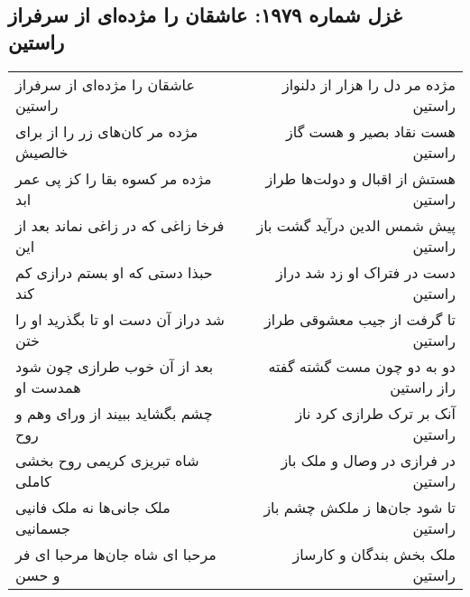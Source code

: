 \begin{center}
\section*{غزل شماره ۱۹۷۹: عاشقان را مژده‌ای از سرفراز راستین}
\label{sec:1979}
\begin{longtable}{l p{0.5cm} r}
عاشقان را مژده‌ای از سرفراز راستین
&&
مژده مر دل را هزار از دلنواز راستین
\\
مژده مر کان‌های زر را از برای خالصیش
&&
هست نقاد بصیر و هست گاز راستین
\\
مژده مر کسوه بقا را کز پی عمر ابد
&&
هستش از اقبال و دولت‌ها طراز راستین
\\
فرخا زاغی که در زاغی نماند بعد از این
&&
پیش شمس الدین درآید گشت باز راستین
\\
حبذا دستی که او بستم درازی کم کند
&&
دست در فتراک او زد شد دراز راستین
\\
شد دراز آن دست او تا بگذرید او را ختن
&&
تا گرفت از جیب معشوقی طراز راستین
\\
بعد از آن خوب طرازی چون شود همدست او
&&
دو به دو چون مست گشته گفته راز راستین
\\
چشم بگشاید ببیند از ورای وهم و روح
&&
آنک بر ترک طرازی کرد ناز راستین
\\
شاه تبریزی کریمی روح بخشی کاملی
&&
در فرازی در وصال و ملک باز راستین
\\
ملک جانی‌ها نه ملک فانیی جسمانیی
&&
تا شود جان‌ها ز ملکش چشم باز راستین
\\
مرحبا ای شاه جان‌ها مرحبا ای فر و حسن
&&
ملک بخش بندگان و کارساز راستین
\\
\end{longtable}
\end{center}
